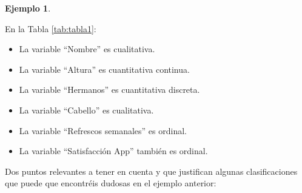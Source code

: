 \documentclass[
]{book}
\providecommand{\tightlist}{%
  \setlength{\itemsep}{0pt}\setlength{\parskip}{0pt}}
\theoremstyle{definition}
\theoremstyle{definition}
\newtheorem{example}{Ejemplo}[chapter]
\theoremstyle{definition}
\theoremstyle{definition}
\theoremstyle{remark}
\begin{document}
\begin{example}
\protect\hypertarget{exm:unnamed-chunk-200}{}\label{exm:unnamed-chunk-200}

En la Tabla \ref{tab:tabla1}:

\begin{itemize}
\tightlist
\item
  La variable ``Nombre'' es cualitativa.
\item
  La variable ``Altura'' es cuantitativa continua.
\item
  La variable ``Hermanos'' es cuantitativa discreta.
\item
  La variable ``Cabello'' es cualitativa.
\item
  La variable ``Refrescos semanales'' es ordinal.
\item
  La variable ``Satisfacción App'' también es ordinal.
\end{itemize}

\end{example}

Dos puntos relevantes a tener en cuenta y que justifican algunas clasificaciones que puede que encontréis dudosas en el ejemplo anterior:
\end{document}

